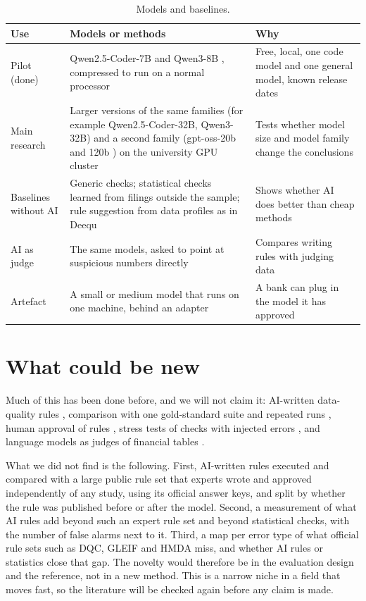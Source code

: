 \documentclass[11pt,a4paper]{article}
\begin{document}
\begin{table}[htbp]
\centering
\small
\begin{tabularx}{\textwidth}{@{}p{2.8cm}p{4.6cm}L@{}}
\toprule
Use & Models or methods & Why \\
\midrule
Pilot (done) & Qwen2.5-Coder-7B and Qwen3-8B \cite{qwen25coder,qwen3}, compressed to run on a normal processor & Free, local, one code model and one general model, known release dates \\
Main research & Larger versions of the same families (for example Qwen2.5-Coder-32B, Qwen3-32B) and a second family (gpt-oss-20b and 120b \cite{gptoss}) on the university GPU cluster & Tests whether model size and model family change the conclusions \\
Baselines without AI & Generic checks; statistical checks learned from filings outside the sample; rule suggestion from data profiles as in Deequ \cite{deequ} & Shows whether AI does better than cheap methods \\
AI as judge & The same models, asked to point at suspicious numbers directly & Compares writing rules with judging data \\
Artefact & A small or medium model that runs on one machine, behind an adapter & A bank can plug in the model it has approved \\
\bottomrule
\end{tabularx}
\caption{Models and baselines.}
\label{tab:models}
\end{table}

\section{What could be new}

Much of this has been done before, and we will not claim it: AI-written data-quality rules \cite{ledqer,akella,audq}, comparison with one gold-standard suite and repeated runs \cite{alexander}, human approval of rules \cite{audq}, stress tests of checks with injected errors \cite{homayouni,jenga}, and language models as judges of financial tables \cite{secfintables,finauditing}.

What we did not find is the following. First, AI-written rules executed and compared with a large public rule set that experts wrote and approved independently of any study, using its official answer keys, and split by whether the rule was published before or after the model. Second, a measurement of what AI rules add beyond such an expert rule set and beyond statistical checks, with the number of false alarms next to it. Third, a map per error type of what official rule sets such as DQC, GLEIF and HMDA miss, and whether AI rules or statistics close that gap. The novelty would therefore be in the evaluation design and the reference, not in a new method. This is a narrow niche in a field that moves fast, so the literature will be checked again before any claim is made.
\end{document}
